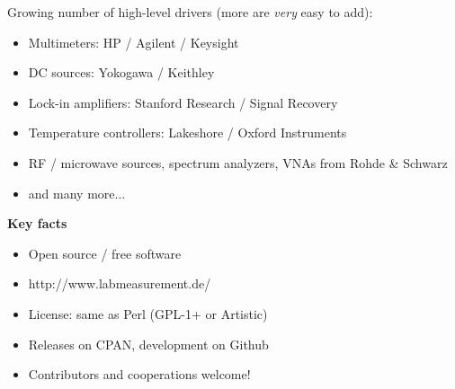 \documentclass[portrait]{a0poster}
\newcommand{\heading}[1]{
  {\color{heading}\boldmath\textbf{\huge #1}}\\[\medskipamount]
}
\begin{document}
{\begin{minipage}[t][\columnheighta-2\fboxsep-2\fboxrule][t]
\begin{minipage}{\textwidth}
\vspace*{1cm}
Growing number of high-level drivers (more are {\it very} easy to add):
{\large
\begin{itemize}
\item Multimeters: HP / Agilent / Keysight
\item DC sources: Yokogawa / Keithley
\item Lock-in amplifiers: Stanford Research / Signal Recovery
\item Temperature controllers: Lakeshore / Oxford Instruments
\item RF / microwave sources, spectrum analyzers, VNAs from Rohde \& Schwarz 
\item and many more...
\end{itemize}
}
\vspace*{1cm}
\heading{Key facts}
\vspace*{-2cm}
\begin{itemize}
 \item
 Open source / free software\\[-5cm]
 \item 
 http://www.labmeasurement.de/
 \hfill{}
 \item
 License: same as Perl (GPL-1+ or Artistic)
 \item
 Releases on CPAN, development on Github
 \item
 Contributors and cooperations welcome!
\end{itemize}






%
%
%
\end{minipage}
%
\end{minipage}}
%
%
%
%
\end{document}
